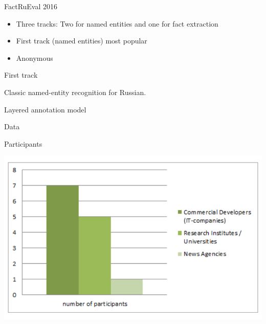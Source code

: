 \documentclass[10pt, compress]{beamer}
\begin{document}
\begin{frame}{FactRuEval 2016}

\begin{itemize}
  \item Three tracks: Two for named entities and one for fact extraction
  \item First track (named entities) most popular
  \item Anonymous
\end{itemize}

\end{frame}

\begin{frame}{First track}

Classic named-entity recognition for Russian.

\end{frame}


\begin{frame}{Layered annotation model}


\end{frame}

\begin{frame}{Data}

\end{frame}

\begin{frame}{Participants}

\begin{center}
\includegraphics[width=\textwidth]{graphics/factrueval-participants.png}
\end{center}

\end{frame}
\end{document}
